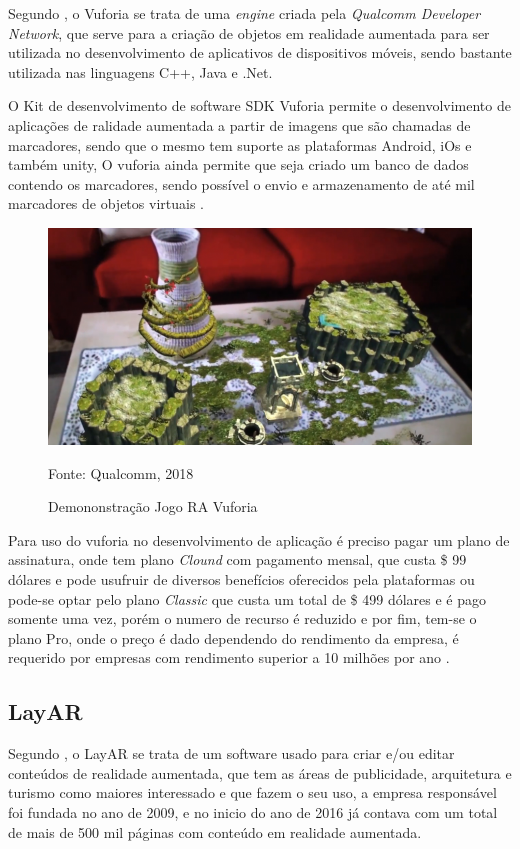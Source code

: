 		Segundo , o Vuforia se trata de uma \textit{engine} criada pela \textit{Qualcomm Developer Network}, que serve para a criação de objetos em realidade aumentada para ser utilizada no desenvolvimento de aplicativos de dispositivos móveis, sendo bastante utilizada nas linguagens C++, Java e .Net.
		
		O Kit de desenvolvimento de software SDK Vuforia permite o  desenvolvimento de aplicações de ralidade aumentada a partir de imagens que são chamadas de marcadores, sendo que o mesmo tem suporte as plataformas Android, iOs e também unity, O vuforia ainda permite que seja criado um banco de dados contendo os marcadores, sendo possível o envio e armazenamento de até mil marcadores de objetos virtuais \cite{bergamaschi2014estudo}.
		
		\begin{figure}[H]
			\centering
			\includegraphics[scale=0.5]{imagens/vuforia-jogo}
			\caption{Demononstração Jogo RA Vuforia}
			Fonte: Qualcomm, 2018
			\label{fig:vuforia-jogo}
		\end{figure}
		
		Para uso do vuforia no desenvolvimento de aplicação é preciso pagar um plano de assinatura, onde tem plano \textit{Clound} com pagamento mensal, que custa \$ 99 dólares e pode usufruir de diversos benefícios oferecidos pela plataformas ou pode-se optar pelo plano \textit{Classic} que custa um total de \$ 499 dólares e é pago somente uma vez, porém o numero de recurso é reduzido e por fim, tem-se o plano Pro, onde o preço é dado dependendo do rendimento da empresa, é requerido por empresas com rendimento superior a 10 milhões por ano \cite{vuforia:2018}.
		
		
	\subsection{LayAR}
		Segundo , o LayAR se trata de um software usado para criar e/ou editar conteúdos de realidade aumentada, que tem as áreas de publicidade, arquitetura e turismo como maiores interessado e que fazem o seu uso, a empresa responsável foi fundada no ano de 2009, e no inicio do ano de 2016 já contava com um total de mais de 500 mil páginas com conteúdo em realidade aumentada.
		
